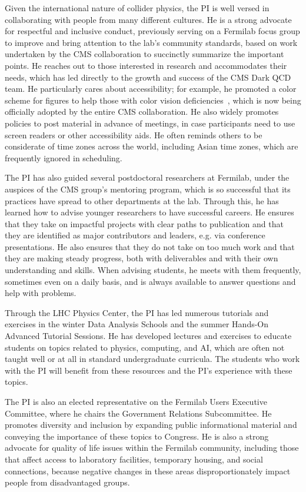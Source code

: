 Given the international nature of collider physics,
the PI is well versed in collaborating with people from many different cultures.
He is a strong advocate for respectful and inclusive conduct,
previously serving on a Fermilab focus group to improve and bring attention to the lab's community standards,
based on work undertaken by the CMS collaboration to succinctly summarize the important points.
He reaches out to those interested in research and accommodates their needs,
which has led directly to the growth and success of the CMS Dark QCD team.
He particularly cares about accessibility;
for example, he promoted a color scheme for figures to help those with color vision deficiencies~\cite{Petroff:2021},
which is now being officially adopted by the entire CMS collaboration.
He also widely promotes policies to post material in advance of meetings,
in case participants need to use screen readers or other accessibility aids.
He often reminds others to be considerate of time zones across the world,
including Asian time zones, which are frequently ignored in scheduling.

The PI has also guided several postdoctoral researchers at Fermilab,
under the auspices of the CMS group's mentoring program,
which is so successful that its practices have spread to other departments at the lab.
Through this, he has learned how to advise younger researchers to have successful careers.
He ensures that they take on impactful projects with clear paths to publication
and that they are identified as major contributors and leaders, e.g. via conference presentations.
He also ensures that they do not take on too much work and that they are making steady progress,
both with deliverables and with their own understanding and skills.
When advising students, he meets with them frequently, sometimes even on a daily basis,
and is always available to answer questions and help with problems.

Through the LHC Physics Center, the PI has led numerous tutorials and exercises in the winter Data Analysis Schools
and the summer Hands-On Advanced Tutorial Sessions.
He has developed lectures and exercises to educate students on topics related to physics, computing, and AI,
which are often not taught well or at all in standard undergraduate curricula.
The students who work with the PI will benefit from these resources
and the PI's experience with these topics.

The PI is also an elected representative on the Fermilab Users Executive Committee,
where he chairs the Government Relations Subcommittee.
He promotes diversity and inclusion by expanding public informational material
and conveying the importance of these topics to Congress.
He is also a strong advocate for quality of life issues within the Fermilab community,
including those that affect access to laboratory facilities, temporary housing, and social connections,
because negative changes in these areas disproportionately impact people from disadvantaged groups.
